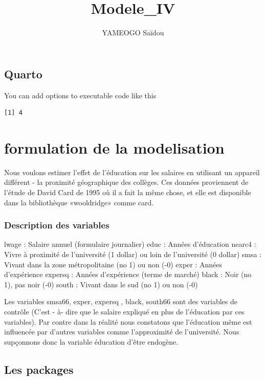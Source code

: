 \documentclass[
  letterpaper,
  DIV=11,
  numbers=noendperiod]{scrartcl}
\title{Modele\_IV}
\author{YAMEOGO Saïdou}
\date{}
\begin{document}
\maketitle


\subsection{Quarto}\label{quarto}

You can add options to executable code like this

\begin{verbatim}
[1] 4
\end{verbatim}

\section{formulation de la
modelisation}\label{formulation-de-la-modelisation}

Nous voulons estimer l'effet de l'éducation sur les salaires en
utilisant un appareil différent - la proximité géographique des
collèges. Ces données proviennent de l'étude de David Card de 1995 où il
a fait la même chose, et elle est disponible dans la bibliothèque
«wooldridge» comme card.

\subsubsection{Description des
variables}\label{description-des-variables}

lwage : Salaire annuel (formulaire journalier) educ : Années d'éducation
nearc4 : Vivre à proximité de l'université (1 dollar) ou loin de
l'université (0 dollar) smsa : Vivant dans la zone métropolitaine (no 1)
ou non (-0) exper : Années d'expérience expersq : Années d'expérience
(terme de marché) black : Noir (no 1), pas noir (-0) south : Vivant dans
le sud (no 1) ou non (-0)

Les variables smsa66, exper, expersq , black, south66 sont des variables
de contrôle (C'est - à- dire que le salaire expliqué en plus de
l'éducation par ces variables). Par contre dans la réalité nous
constatons que l'éducation même est influencée par d'autres variables
comme l'approximité de l'université. Nous supçonnons donc la variable
éducation d'être endogène.

\subsection{Les packages}\label{les-packages}
\end{document}
